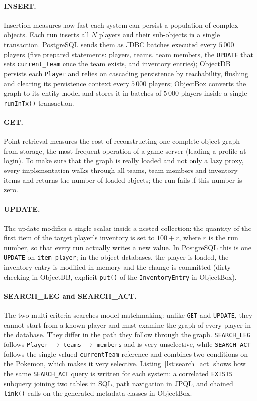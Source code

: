 \documentclass{article}
\begin{document}
\paragraph{INSERT.} Insertion measures how fast each system can persist a population of complex objects. Each run inserts all $N$ players and their sub-objects in a single transaction. PostgreSQL sends them as JDBC batches executed every $5\,000$ players (five prepared statements: players, teams, team members, the \texttt{UPDATE} that sets \texttt{current\_team} once the team exists, and inventory entries); ObjectDB persists each \texttt{Player} and relies on cascading persistence by reachability, flushing and clearing its persistence context every $5\,000$ players; ObjectBox converts the graph to its entity model and stores it in batches of $5\,000$ players inside a single \texttt{runInTx()} transaction.

\paragraph{GET.} Point retrieval measures the cost of reconstructing one complete object graph from storage, the most frequent operation of a game server (loading a profile at login). To make sure that the graph is really loaded and not only a lazy proxy, every implementation walks through all teams, team members and inventory items and returns the number of loaded objects; the run fails if this number is zero.

\paragraph{UPDATE.} The update modifies a single scalar inside a nested collection: the quantity of the first item of the target player's inventory is set to $100 + r$, where $r$ is the run number, so that every run actually writes a new value. In PostgreSQL this is one \texttt{UPDATE} on \texttt{item\_player}; in the object databases, the player is loaded, the inventory entry is modified in memory and the change is committed (dirty checking in ObjectDB, explicit \texttt{put()} of the \texttt{InventoryEntry} in ObjectBox).

\paragraph{SEARCH\_LEG and SEARCH\_ACT.} The two multi-criteria searches model matchmaking: unlike \texttt{GET} and \texttt{UPDATE}, they cannot start from a known player and must examine the graph of every player in the database. They differ in the path they follow through the graph. \texttt{SEARCH\_LEG} follows \texttt{Player} $\rightarrow$ \texttt{teams} $\rightarrow$ \texttt{members} and is very unselective, while \texttt{SEARCH\_ACT} follows the single-valued \texttt{currentTeam} reference and combines two conditions on the Pokemon, which makes it very selective. Listing~\ref{lst:search_act} shows how the same \texttt{SEARCH\_ACT} query is written for each system: a correlated \texttt{EXISTS} subquery joining two tables in SQL, path navigation in JPQL, and chained \texttt{link()} calls on the generated metadata classes in ObjectBox.
\end{document}
